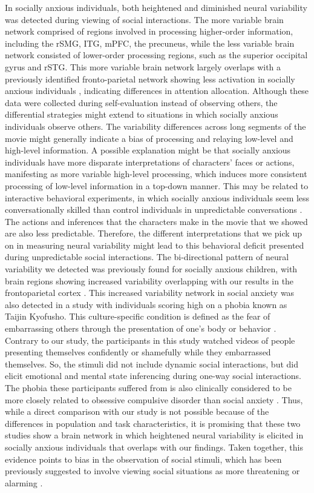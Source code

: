 In socially anxious individuals, both heightened and diminished neural variability was detected during viewing of social interactions. The more variable brain network comprised of regions involved in processing higher-order information, including the rSMG, ITG, mPFC, the precuneus, while the less variable brain network consisted of lower-order processing regions, such as the superior occipital gyrus and rSTG. This more variable brain network largely overlaps with a previously identified fronto-parietal network showing less activation in socially anxious individuals \citep{koban2023}, indicating differences in attention allocation. Although these data were collected during self-evaluation instead of observing others, the differential strategies might extend to situations in which socially anxious individuals observe others. The variability differences across long segments of the movie might generally indicate a bias of processing and relaying low-level and high-level information. A possible explanation might be that socially anxious individuals have more disparate interpretations of characters' faces or actions, manifesting as more variable high-level processing, which induces more consistent processing of low-level information in a top-down manner. This may be related to interactive behavioral experiments, in which socially anxious individuals seem less conversationally skilled than control individuals in unpredictable conversations \citep{thompson2002,pilkonis1977}. The actions and inferences that the characters make in the movie that we showed are also less predictable. Therefore, the different interpretations that we pick up on in measuring neural variability might lead to this behavioral deficit presented during unpredictable social interactions. The bi-directional pattern of neural variability we detected was previously found for socially anxious children, with brain regions showing increased variability overlapping with our results in the frontoparietal cortex \citep{camacho2023}. This increased variability network in social anxiety was also detected in a study with individuals scoring high on a phobia known as Taijin Kyofusho. This culture-specific condition is defined as the fear of embarrassing others through the presentation of one's body or behavior \citep{tei2020}. Contrary to our study, the participants in this study watched videos of people presenting themselves confidently or shamefully while they embarrassed themselves. So, the stimuli did not include dynamic social interactions, but did elicit emotional and mental state inferencing during one-way social interactions. The phobia these participants suffered from is also clinically considered to be more closely related to obsessive compulsive disorder than social anxiety \citep{apa2013}. Thus, while a direct comparison with our study is not possible because of the differences in population and task characteristics, it is promising that these two studies show a brain network in which heightened neural variability is elicited in socially anxious individuals that overlaps with our findings. Taken together, this evidence points to bias in the observation of social stimuli, which has been previously suggested to involve viewing social situations as more threatening or alarming \citep{rapee1997}.

